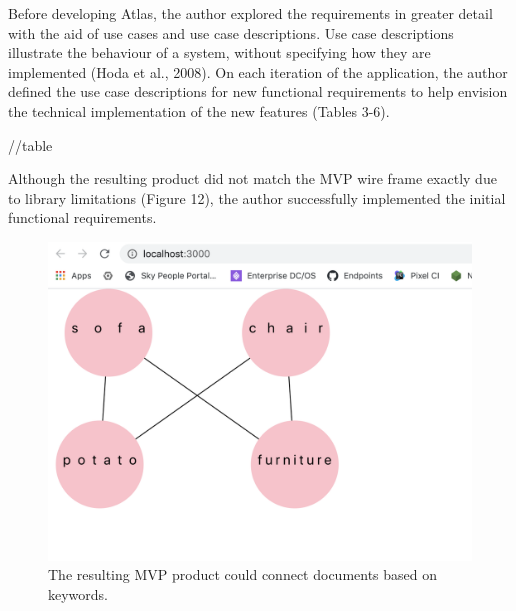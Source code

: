 \documentclass{article}
\begin{document}
Before developing Atlas, the author explored the requirements in greater detail with the aid of use cases and use case descriptions. Use case descriptions illustrate the behaviour of a system, without specifying how they are implemented (Hoda et al., 2008). On each iteration of the application, the author defined the use case descriptions for new functional requirements to help envision the technical implementation of the new features (Tables 3-6).

//table

Although the resulting product did not match the MVP wire frame exactly due to library limitations (Figure 12), the author successfully implemented the initial functional requirements.

\begin{figure}[!htb]
  \centering
      \includegraphics[width=1\textwidth]{images/mvp-frontend.png}
  \caption{The resulting MVP product could connect documents based on keywords.}
\end{figure}


\begin{table}[]
\centering
\caption{The functional requirements and use cases that defined the minimum viable product.}
\label{tab:my-table}
\end{table}
\end{document}
